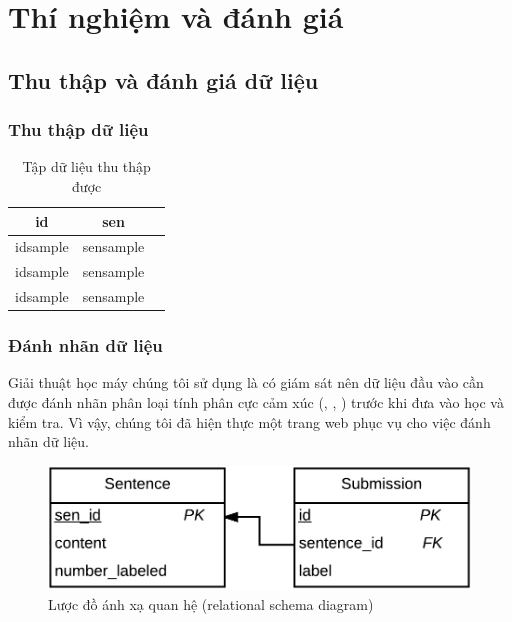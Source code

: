 \section{Thí nghiệm và đánh giá} \label{sec:thi-nghiem-va-danh-gia}
\subsection{Thu thập và đánh giá dữ liệu}
\subsubsection*{Thu thập dữ liệu}

\begin{table}[H]
\centering
\begin{minipage}{1.0\textwidth}
\caption{Tập dữ liệu thu thập được} 
\label{table:data}
\begin{tabular}{ |c|c|c| } 
 \hline
 id & sen \\ 
 \hline
 idsample & sensample \\ 
 idsample & sensample \\ 
 idsample & sensample \\ 
 \hline
\end{tabular}
\end{minipage}
\end{table}

\subsubsection*{Đánh nhãn dữ liệu}
Giải thuật học máy chúng tôi sử dụng là có giám sát nên dữ liệu đầu vào cần được đánh nhãn phân loại tính phân cực cảm xúc (\tichcuc, \tieucuc, \trungtinh) trước khi đưa vào học và kiểm tra. Vì vậy, chúng tôi đã hiện thực một trang web phục vụ cho việc đánh nhãn dữ liệu.\\

\begin{figure}[h]
\centering
\includegraphics[scale=0.4]{../hinh/SQL.png}
\caption{Lược đồ ánh xạ quan hệ (relational schema diagram)}
\label{fig:SQL}
\end{figure}

